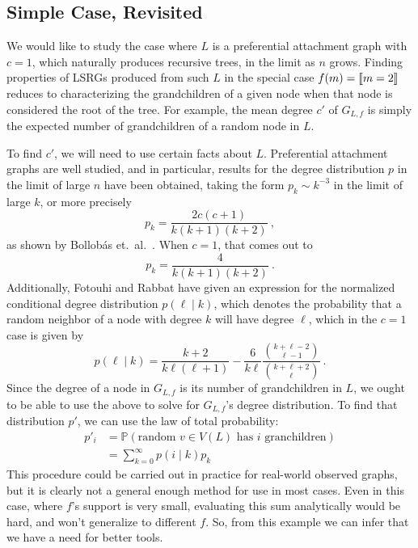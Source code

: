 \documentclass[12pt]{article}
\renewcommand{\P}{\mathbb{P}}
\DeclarePairedDelimiter\iverson{\llbracket}{\rrbracket}%
\begin{document}
\subsection{\textbf{\textsf{Simple Case, Revisited}}}

We would like to study the case where $L$ is a preferential attachment
graph with $c=1$, which naturally produces recursive trees, in the
limit as $n$ grows. Finding properties of LSRGs produced from such $L$
in the special case $f(m)=\iverson{m=2}$ reduces to characterizing
the grandchildren of a given node when that node is considered the
root of the tree. For example, the mean degree $c'$ of $G_{L,f}$ is simply
the expected number of grandchildren of a random node in $L$.\par

To find $c'$, we will need to use certain facts about $L$.
Preferential attachment graphs are well studied, and in particular,
results for the degree distribution $p$ in the limit of large $n$ have
been obtained, taking the form $p_k \sim k^{-3}$
in the limit of large $k$, or more precisely
\[
p_k = \frac{2c(c+1)}{k(k+1)(k+2)}\ ,
\]
as shown by Bollob{\'a}s et.\ al.\ \cite{bollobas}. When $c=1$,
that comes out to
\[
p_k = \frac{4}{k(k+1)(k+2)}\ .
\]
Additionally,
Fotouhi and Rabbat \cite{fotouhi} have given an expression for the
normalized conditional degree distribution $p(\ell\mid k)$, which
denotes the probability that a random neighbor of a node with
degree $k$ will have degree $\ell$, which in the $c=1$ case is
given by
\[
p(\ell\mid k) = \frac{k+2}{k\ell(\ell + 1)} - \frac{6}{k\ell}
\frac{{{k + \ell - 2}\choose{\ell - 1}}}{{{k + \ell + 2}\choose \ell}}\ .
\]
Since the degree of a node in $G_{L,f}$ is its number of grandchildren
in $L$, we ought to be able to use the above to solve for $G_{L,f}$'s
degree distribution. To find that distribution $p'$, we can use
the law of total probability:
\begin{align*}
p'_i &= \P(\text{random }v\in V(L)\text{ has }i\text{ granchildren})\\
     &= \sum_{k=0}^\infty p(i \mid k)p_k
\end{align*}
This procedure could be carried out in practice for real-world observed
graphs, but it is clearly not a general enough method for use in most
cases. Even in this case, where $f$'s support is very small, evaluating
this sum analytically would be hard, and won't generalize to different
$f$. So, from this example we can infer that we have a need for better
tools.\par
\end{document}
